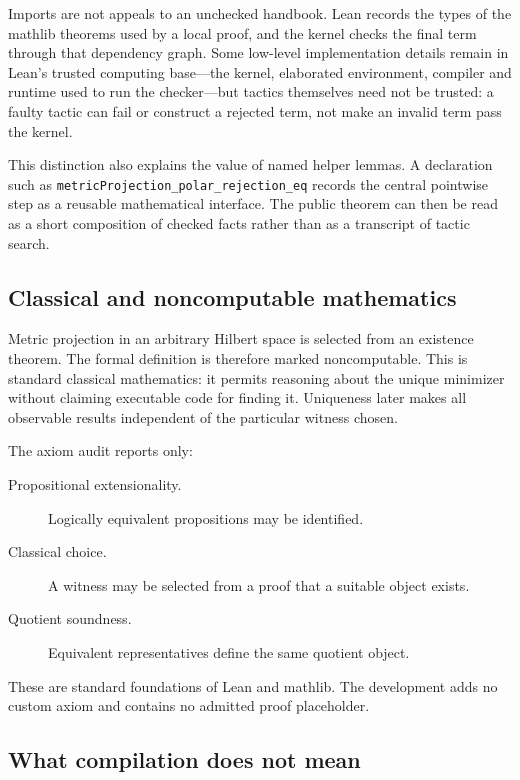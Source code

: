 \documentclass[11pt,a4paper]{article}
\begin{document}
Imports are not appeals to an unchecked handbook. Lean records the types of the
mathlib theorems used by a local proof, and the kernel checks the final term
through that dependency graph. Some low-level implementation details remain in
Lean's trusted computing base---the kernel, elaborated environment, compiler and
runtime used to run the checker---but tactics themselves need not be trusted:
a faulty tactic can fail or construct a rejected term, not make an invalid term
pass the kernel.

This distinction also explains the value of named helper lemmas. A declaration
such as \texttt{metricProjection\_polar\_rejection\_eq} records the central
pointwise step as a reusable mathematical interface. The public theorem can then
be read as a short composition of checked facts rather than as a transcript of
tactic search.

\subsection{Classical and noncomputable mathematics}

Metric projection in an arbitrary Hilbert space is selected from an existence
theorem. The formal definition is therefore marked noncomputable. This is
standard classical mathematics: it permits reasoning about the unique
minimizer without claiming executable code for finding it. Uniqueness later
makes all observable results independent of the particular witness chosen.

The axiom audit reports only:

\begin{description}
  \item[Propositional extensionality.]
  Logically equivalent propositions may be identified.
  \item[Classical choice.]
  A witness may be selected from a proof that a suitable object exists.
  \item[Quotient soundness.]
  Equivalent representatives define the same quotient object.
\end{description}

These are standard foundations of Lean and mathlib. The development adds no
custom axiom and contains no admitted proof placeholder.

\subsection{What compilation does not mean}
\end{document}
